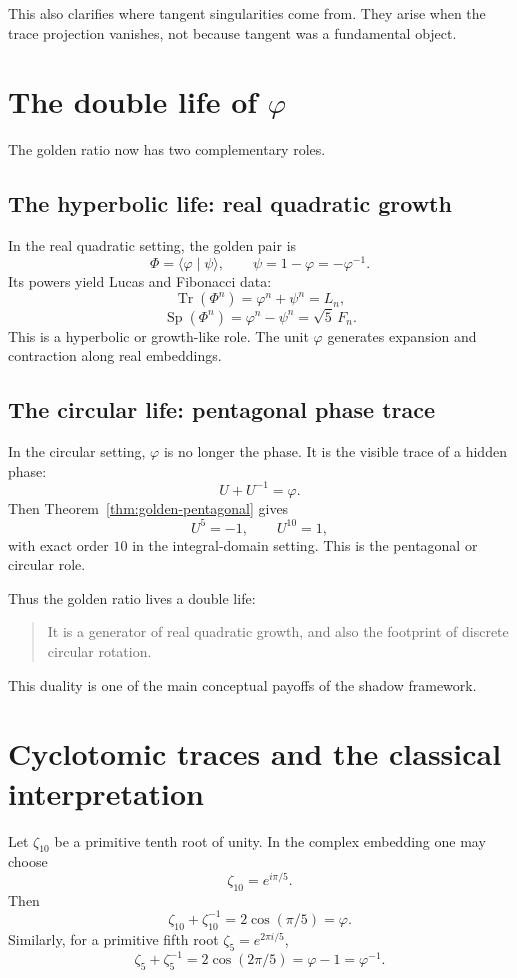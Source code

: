\documentclass[11pt]{article}
\newcommand{\Tr}{\operatorname{Tr}}
\newcommand{\Sp}{\operatorname{Sp}}
\newcommand{\ph}{\varphi}
\newcommand{\ps}{\psi}
\begin{document}
This also clarifies where tangent singularities come from.  They arise when the trace projection vanishes, not because tangent was a fundamental object.

\section{The double life of \texorpdfstring{$\varphi$}{phi}}

The golden ratio now has two complementary roles.

\subsection{The hyperbolic life: real quadratic growth}

In the real quadratic setting, the golden pair is
\[
    \Phi=\langle \ph\mid\ps\rangle,
    \qquad
    \ps=1-\ph=-\ph^{-1}.
\]
Its powers yield Lucas and Fibonacci data:
\[
    \Tr(\Phi^n)=\ph^n+\ps^n=L_n,
\]
\[
    \Sp(\Phi^n)=\ph^n-\ps^n=\sqrt5\,F_n.
\]
This is a hyperbolic or growth-like role.  The unit $\ph$ generates expansion and contraction along real embeddings.

\subsection{The circular life: pentagonal phase trace}

In the circular setting, $\ph$ is no longer the phase.  It is the visible trace of a hidden phase:
\[
    U+U^{-1}=\ph.
\]
Then Theorem~\ref{thm:golden-pentagonal} gives
\[
    U^5=-1,
    \qquad
    U^{10}=1,
\]
with exact order $10$ in the integral-domain setting.  This is the pentagonal or circular role.

Thus the golden ratio lives a double life:
\begin{quote}
It is a generator of real quadratic growth, and also the footprint of discrete circular rotation.
\end{quote}

This duality is one of the main conceptual payoffs of the shadow framework.

\section{Cyclotomic traces and the classical interpretation}

Let $\zeta_{10}$ be a primitive tenth root of unity.  In the complex embedding one may choose
\[
    \zeta_{10}=e^{i\pi/5}.
\]
Then
\[
    \zeta_{10}+\zeta_{10}^{-1}=2\cos(\pi/5)=\ph.
\]
Similarly, for a primitive fifth root $\zeta_5=e^{2\pi i/5}$,
\[
    \zeta_5+\zeta_5^{-1}=2\cos(2\pi/5)=\ph-1=\ph^{-1}.
\]
\end{document}
